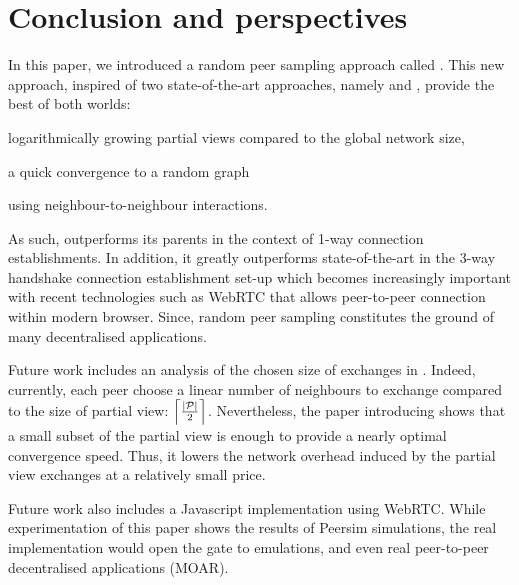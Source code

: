 
\section{Conclusion and perspectives}
\label{sec:conclusion}

In this paper, we introduced a random peer sampling approach called
\SCAMPLON{}.  This new approach, inspired of two state-of-the-art approaches,
namely \SCAMP{} and \CYCLON{}, provide the best of both worlds:
\begin{inparaenum}[(i)]
\item logarithmically growing partial views compared to the global network
  size,
\item a quick convergence to a random graph
\item using neighbour-to-neighbour interactions.
\end{inparaenum}
As such, \SCAMPLON{} outperforms its parents in the context of 1-way connection
establishments. In addition, it greatly outperforms state-of-the-art in the
3-way handshake connection establishment set-up which becomes increasingly
important with recent technologies such as WebRTC that allows peer-to-peer
connection within modern browser. Since, random peer sampling constitutes the
ground of many decentralised applications.

Future work includes an analysis of the chosen size of exchanges in
\SCAMPLON{}. Indeed, currently, each peer choose a linear number of neighbours
to exchange compared to the size of partial view:
$\left\lceil |\mathcal{P}|\over{2} \right\rceil$. Nevertheless, the paper
introducing \CYCLON{} shows that a small subset of the partial view is enough
to provide a nearly optimal convergence speed. Thus, it lowers the network
overhead induced by the partial view exchanges at a relatively small price.

Future work also includes a Javascript implementation using WebRTC. While
experimentation of this paper shows the results of Peersim simulations, the
real implementation would open the gate to emulations, and even real
peer-to-peer decentralised applications (MOAR).

